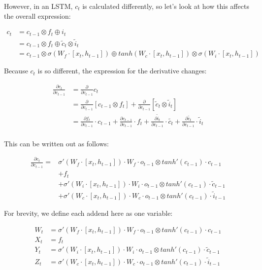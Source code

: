 \noindent
However, in an LSTM, $c_t$ is calculated differently, so let's look at how this affects the overall expression:

\begin{align}
    c_t &= c_{t-1} \otimes f_t \oplus i_t \\
    &=  c_{t-1} \otimes f_t \oplus \tilde{c}_t \otimes \tilde{i}_t \\
    &= c_{t-1} \otimes \sigma (W_f \cdot [x_t,h_{t-1}]) \oplus tanh(W_c \cdot [x_t,h_{t-1}]) \otimes \sigma (W_i \cdot [x_t,h_{t-1}])
\end{align}

\noindent
Because $c_t$ is so different, the expression for the derivative changes:

\begin{align}
    \frac{\partial c_t}{\partial c_{t-1}} &= \frac{\partial}{\partial c_{t-1}} c_t \\
    &= \frac{\partial}{\partial c_{t-1}} \left[c_{t-1} \otimes f_t \right] + \frac{\partial}{\partial c_{t-1}} \left[\tilde{c}_t \otimes \tilde{i}_t \right] \\
    &= \frac{\partial f_t}{\partial c_{t-1}} \cdot c_{t-1} + \frac{\partial c_{t-1}}{\partial c_{t-1}} \cdot f_t + \frac{\partial \tilde{i}_t}{\partial c_{t-1}} \cdot \tilde{c_t} + \frac{\partial \tilde{c_t}}{\partial c_{t-1}} \cdot \tilde{i}_t \\
\end{align}

\noindent
This can be written out as follows:

\begin{align}
    \frac{\partial c_t}{\partial c_{t-1}} =& \sigma'(W_f \cdot [x_t,h_{t-1}]) \cdot W_f \cdot o_{t-1} \otimes tanh'(c_{t-1}) \cdot c_{t-1} \\
    &+ f_t \\
    &+ \sigma'(W_i \cdot [x_t,h_{t-1}]) \cdot W_i \cdot o_{t-1} \otimes tanh'(c_{t-1}) \cdot \tilde{c}_{t-1} \\
    &+ \sigma'(W_c \cdot [x_t,h_{t-1}]) \cdot W_c \cdot o_{t-1} \otimes tanh'(c_{t-1}) \cdot \tilde{i}_{t-1}
\end{align}

\noindent
For brevity, we define each addend here as one variable:

\begin{align}
    W_t &= \sigma'(W_f \cdot [x_t,h_{t-1}]) \cdot W_f \cdot o_{t-1} \otimes tanh'(c_{t-1}) \cdot c_{t-1} \\
    X_t &= f_t \\
    Y_t &= \sigma'(W_i \cdot [x_t,h_{t-1}]) \cdot W_i \cdot o_{t-1} \otimes tanh'(c_{t-1}) \cdot \tilde{c}_{t-1} \\
    Z_t &= \sigma'(W_c \cdot [x_t,h_{t-1}]) \cdot W_c \cdot o_{t-1} \otimes tanh'(c_{t-1}) \cdot \tilde{i}_{t-1}
\end{align}

